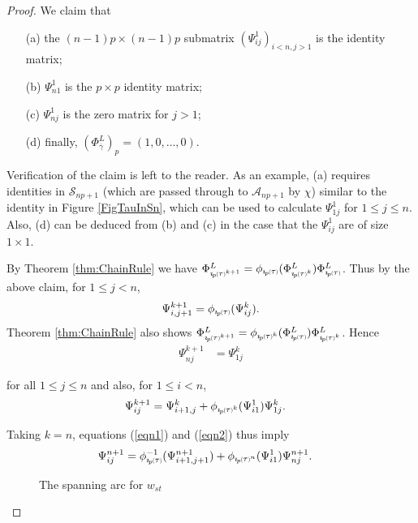 \documentclass[11pt]{amsart}
\def\A{{\mathcal A}}
\newcommand*{\subsmallp}[1]{\scalebox{.5}{\ensuremath#1}}
\newcommand{\subpp}[2][p]{\imath_{\hspace*{-1pt}#1}\hspace*{-.5pt}\subsmallp(#2\subsmallp)}
\newcommand{\al}[1]{\begin{align*}#1\end{align*}}
\theoremstyle{definition}
\begin{document}
\begin{proof}
We claim that 
  \begin{enumerate}
    \item[(a)] the $(n-1)p\times(n-1)p$ submatrix $(\Psi_{ij}^1)_{i<n,j>1}$ is the identity matrix;
    \item[(b)] $\Psi_{n1}^1$ is the $p\times p$ identity matrix;
    \item[(c)] $\Psi_{nj}^1$ is the zero matrix for $j>1$;
    \item[(d)] finally, $(\Phi_{\overline\gamma}^L)_p = (1,0,\ldots,0)$.
  \end{enumerate}
Verification of the claim is left to the reader. As an example, (a) requires identities in $\mathscr S_{np+1}$ (which are passed through to $\A_{np+1}$ by $\chi$) similar to the identity in Figure \ref{FigTauInSn}, which can be used to calculate $\Psi_{1j}^1$ for $1\le j\le n$. Also, (d) can be deduced from (b) and (c) in the case that the $\Psi_{ij}^1$ are of size $1\times 1$.

By Theorem \ref{thm:ChainRule} we have $\Phi_{\subpp\tau^{k+1}}^L = \phi_{\subpp\tau}(\Phi_{\subpp\tau^{k}}^L)\Phi_{\subpp\tau}^L$. Thus by the above claim, for $1 \le j < n$,
  \begin{equation}
    \Psi_{i,j+1}^{k+1} = \phi_{\subpp\tau}(\Psi_{ij}^k).
    \label{eqn1}
  \end{equation}
Theorem \ref{thm:ChainRule} also shows $\Phi_{\subpp\tau^{k+1}}^L = \phi_{\subpp\tau^k}(\Phi_{\subpp\tau}^L)\Phi_{\subpp\tau^k}^L$. Hence
  \begin{equation}
    \begin{aligned}
      \Psi_{nj}^{k+1}  &= \Psi_{1j}^k
    \end{aligned}
    \label{eqn2}
  \end{equation}
  
for all $1\le j\le n$ and also, for $1\le i < n$,
  \al{
    \Psi_{ij}^{k+1} &= \Psi_{i+1,j}^k + \phi_{\subpp\tau^k}(\Psi_{i1}^1)\Psi_{1j}^k.
  }

Taking $k=n$, equations (\ref{eqn1}) and (\ref{eqn2}) thus imply
  \al{
    \Psi_{ij}^{n+1} &= \phi_{\subpp\tau}^{-1}(\Psi_{i+1,j+1}^{n+1}) + \phi_{\subpp\tau^n}(\Psi_{i1}^1)\Psi_{nj}^{n+1}.
  }
  
  \begin{figure}[ht]
      \caption{The spanning arc for $w_{st}$}
      \label{FigSentToZero2}
    \end{figure}


\end{proof}
\end{document}
